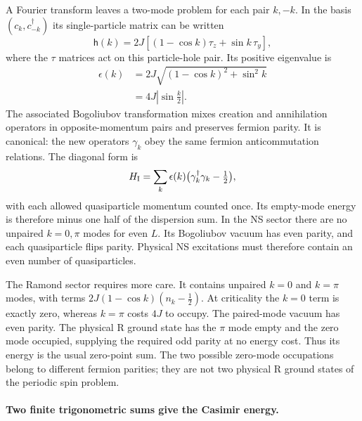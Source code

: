 \begin{example}
A Fourier transform leaves a two-mode problem for each pair
$k,-k$. In the basis $(c_k,c_{-k}^\dagger)$ its single-particle
matrix can be written
\[
 \mathsf h(k)=2J\left[(1-\cos k)\tau_z+\sin k\,\tau_y\right],
\]
where the $\tau$ matrices act on this particle-hole pair.
Its positive eigenvalue is
\begin{equation}
 \begin{aligned}
 \epsilon(k)&=2J\sqrt{(1-\cos k)^2+\sin^2k}\\
            &=4J\left|\sin\frac k2\right|.
 \end{aligned}
 \label{eq:scaling-Ising-dispersion}
\end{equation}
The associated Bogoliubov transformation mixes creation and
annihilation operators in opposite-momentum pairs and preserves
fermion parity. It is canonical: the new operators $\gamma_k$
obey the same fermion anticommutation relations. The diagonal form is
\[
 H_{\rm I}=\sum_k\epsilon(k)
              \bigl(\gamma_k^\dagger\gamma_k-\tfrac12\bigr),
\]
with each allowed quasiparticle momentum counted once. Its empty-mode
energy is therefore minus one half of the dispersion sum.
In the NS sector there are no unpaired $k=0,\pi$
modes for even $L$. Its Bogoliubov vacuum has even parity, and
each quasiparticle flips parity. Physical NS excitations must
therefore contain an even number of quasiparticles.

The Ramond sector requires more care. It contains unpaired
$k=0$ and $k=\pi$ modes, with terms
$2J(1-\cos k)(n_k-\tfrac12)$.
At criticality the $k=0$ term is exactly zero, whereas
$k=\pi$ costs $4J$ to occupy. The paired-mode vacuum has even
parity. The physical R ground state has the $\pi$ mode empty
and the zero mode occupied, supplying the required odd parity
at no energy cost. Thus its energy is the usual zero-point sum.
The two possible zero-mode occupations belong to different
fermion parities; they are not two physical R ground states
of the periodic spin problem.

\paragraph{Two finite trigonometric sums give the Casimir energy.}


\end{example}
